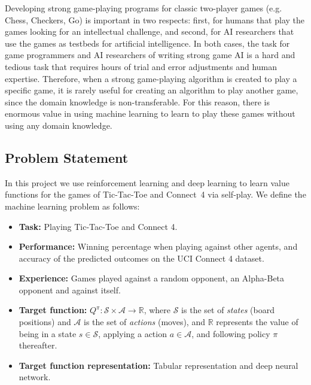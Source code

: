 \documentclass{article}
\begin{document}
Developing strong game-playing programs for classic two-player games (e.g. Chess, Checkers, Go) is
important in two respects: first, for humans that play the games looking for an intellectual
challenge, and second, for AI researchers that use the games as testbeds for artificial
intelligence. In both cases, the task for game programmers and AI researchers of writing strong game
AI is a hard and tedious task that requires hours of trial and error adjustments and human
expertise. Therefore, when a strong game-playing algorithm is created to play a specific game, it is
rarely useful for creating an algorithm to play another game, since the domain knowledge is
non-transferable. For this reason, there is enormous value in using machine learning to learn to
play these games without using any domain knowledge.

\subsection{Problem Statement}
\label{sec:problem-statement}

\newcommand{\URLcf}{https://en.wikipedia.org/wiki/Connect_Four}

In this project we use reinforcement learning and deep learning to learn value functions for the
games of \mbox{Tic-Tac-Toe} and \mbox{Connect 4} via self-play. We define the machine learning
problem as follows:

\begin{itemize}

    \item \textbf{Task:} Playing Tic-Tac-Toe and Connect 4.

    \item \textbf{Performance:} Winning percentage when playing against other agents, and accuracy
        of the predicted outcomes on the UCI Connect 4 dataset.

    \item \textbf{Experience:} Games played against a random opponent, an Alpha-Beta opponent and
        against itself.

    \item \textbf{Target function:} $Q^\pi : \mathcal{S} \times \mathcal{A} \to \mathbb{R}$, where
        $\mathcal{S}$ is the set of \emph{states} (board positions) and $\mathcal{A}$ is the set of
        \emph{actions} (moves), and $\mathbb{R}$ represents the value of being in a state $s \in
        \mathcal{S}$, applying a action $a \in \mathcal{A}$, and following policy $\pi$ thereafter.

    \item \textbf{Target function representation:} Tabular representation and deep neural network.

\end{itemize}
\end{document}
